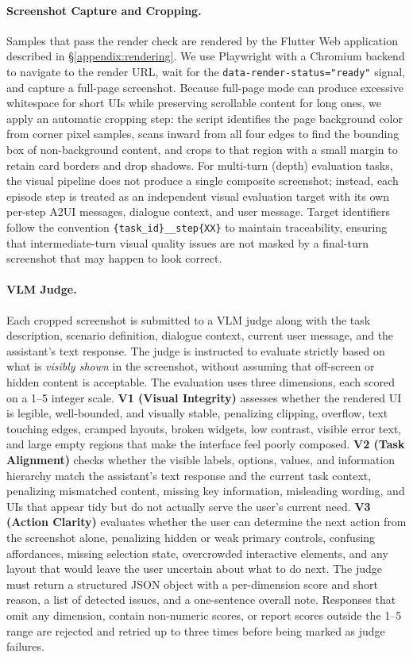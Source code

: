 \paragraph{Screenshot Capture and Cropping.}
Samples that pass the render check are rendered by the Flutter Web application described in \S\ref{appendix:rendering}. We use Playwright with a Chromium backend to navigate to the render URL, wait for the \texttt{data-render-status="ready"} signal, and capture a full-page screenshot. Because full-page mode can produce excessive whitespace for short UIs while preserving scrollable content for long ones, we apply an automatic cropping step: the script identifies the page background color from corner pixel samples, scans inward from all four edges to find the bounding box of non-background content, and crops to that region with a small margin to retain card borders and drop shadows. For multi-turn (depth) evaluation tasks, the visual pipeline does not produce a single composite screenshot; instead, each episode step is treated as an independent visual evaluation target with its own per-step A2UI messages, dialogue context, and user message. Target identifiers follow the convention \texttt{\{task\_id\}\_\_step\{XX\}} to maintain traceability, ensuring that intermediate-turn visual quality issues are not masked by a final-turn screenshot that may happen to look correct.

\paragraph{VLM Judge.}
Each cropped screenshot is submitted to a VLM judge along with the task description, scenario definition, dialogue context, current user message, and the assistant's text response. The judge is instructed to evaluate strictly based on what is \emph{visibly shown} in the screenshot, without assuming that off-screen or hidden content is acceptable. The evaluation uses three dimensions, each scored on a 1--5 integer scale. \textbf{V1 (Visual Integrity)} assesses whether the rendered UI is legible, well-bounded, and visually stable, penalizing clipping, overflow, text touching edges, cramped layouts, broken widgets, low contrast, visible error text, and large empty regions that make the interface feel poorly composed. \textbf{V2 (Task Alignment)} checks whether the visible labels, options, values, and information hierarchy match the assistant's text response and the current task context, penalizing mismatched content, missing key information, misleading wording, and UIs that appear tidy but do not actually serve the user's current need. \textbf{V3 (Action Clarity)} evaluates whether the user can determine the next action from the screenshot alone, penalizing hidden or weak primary controls, confusing affordances, missing selection state, overcrowded interactive elements, and any layout that would leave the user uncertain about what to do next. The judge must return a structured JSON object with a per-dimension score and short reason, a list of detected issues, and a one-sentence overall note. Responses that omit any dimension, contain non-numeric scores, or report scores outside the 1--5 range are rejected and retried up to three times before being marked as judge failures.

